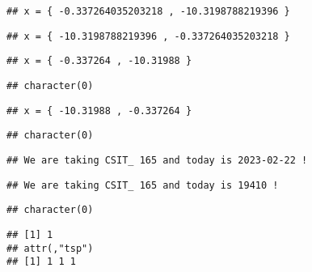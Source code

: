 \documentclass[
]{article}
\begin{document}
\begin{verbatim}
## x = { -0.337264035203218 , -10.3198788219396 }
\end{verbatim}

\begin{verbatim}
## x = { -10.3198788219396 , -0.337264035203218 }
\end{verbatim}

\begin{verbatim}
## x = { -0.337264 , -10.31988 }
\end{verbatim}

\begin{verbatim}
## character(0)
\end{verbatim}

\begin{verbatim}
## x = { -10.31988 , -0.337264 }
\end{verbatim}

\begin{verbatim}
## character(0)
\end{verbatim}

\begin{verbatim}
## We are taking CSIT_ 165 and today is 2023-02-22 !
\end{verbatim}

\begin{verbatim}
## We are taking CSIT_ 165 and today is 19410 !
\end{verbatim}

\begin{verbatim}
## character(0)
\end{verbatim}

\begin{verbatim}
## [1] 1
## attr(,"tsp")
## [1] 1 1 1
\end{verbatim}
\end{document}

